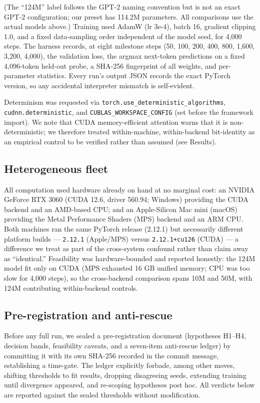 \documentclass{article}
\begin{document}
(The ``124M'' label follows the GPT-2 naming convention but is not an exact GPT-2 configuration;
our preset has 114.2M parameters. All comparisons use the actual models above.) Training used
AdamW (lr 3e-4), batch 16, gradient
clipping 1.0, and a fixed data-sampling order independent of the model seed, for 4,000 steps.
The harness records, at eight milestone steps (50, 100, 200, 400, 800, 1,600, 3,200, 4,000),
the validation loss, the argmax next-token predictions on a fixed 4,096-token held-out probe,
a SHA-256 fingerprint of all weights, and per-parameter statistics. Every run's output JSON
records the exact PyTorch version, so any accidental interpreter mismatch is self-evident.

Determinism was requested via \texttt{torch.use\_deterministic\_algorithms}, \texttt{cudnn.deterministic},
and \texttt{CUBLAS\_WORKSPACE\_CONFIG} (set before the framework import). We note that CUDA
memory-efficient attention warns that it is non-deterministic; we therefore treated
within-machine, within-backend bit-identity as an empirical control to be verified rather
than assumed (see Results).

\subsection{Heterogeneous fleet}\label{heterogeneous-fleet}

All computation used hardware already on hand at no marginal cost: an NVIDIA GeForce RTX 3060
(CUDA 12.6, driver 560.94; Windows) providing the CUDA backend and an AMD-based CPU; and an
Apple-Silicon Mac mini (macOS) providing the Metal Performance Shaders (MPS) backend and an
ARM CPU. Both machines ran the same PyTorch release (2.12.1) but necessarily
different platform builds --- \texttt{2.12.1} (Apple/MPS) versus \texttt{2.12.1+cu126} (CUDA) --- a difference
we treat as part of the cross-system confound rather than claim away as ``identical.'' Feasibility was hardware-bounded and reported honestly: the 124M model fit only
on CUDA (MPS exhausted 16 GB unified memory; CPU was too slow for 4,000 steps), so the
cross-backend comparison spans 10M and 50M, with 124M contributing within-backend controls.

\subsection{Pre-registration and anti-rescue}\label{pre-registration-and-anti-rescue}

Before any full run, we sealed a pre-registration document (hypotheses H1--H4, decision
bands, feasibility caveats, and a seven-item anti-rescue ledger) by committing it with its
own SHA-256 recorded in the commit message, establishing a time-gate. The ledger explicitly
forbade, among other moves, shifting thresholds to fit results, dropping disagreeing seeds,
extending training until divergence appeared, and re-scoping hypotheses post hoc. All
verdicts below are reported against the sealed thresholds without modification.
\end{document}
